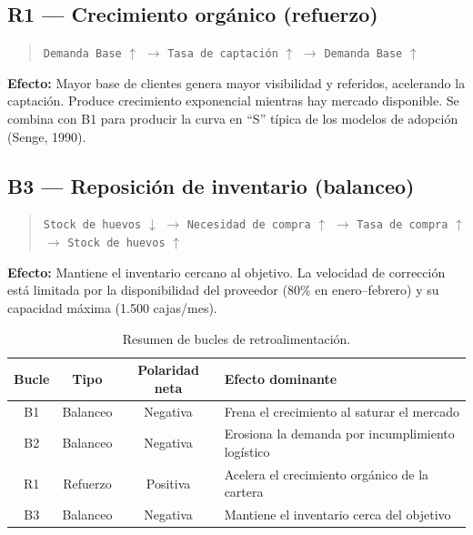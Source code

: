 \documentclass[10pt,a4paper]{article}
\begin{document}
\subsection{R1 --- Crecimiento orgánico \textnormal{(refuerzo)}}

\begin{quote}
\texttt{Demanda Base} $\uparrow$ $\rightarrow$ \texttt{Tasa de captación} $\uparrow$ $\rightarrow$ \texttt{Demanda Base} $\uparrow$
\end{quote}

\textbf{Efecto:} Mayor base de clientes genera mayor visibilidad y referidos, acelerando la captación. Produce crecimiento exponencial mientras hay mercado disponible. Se combina con B1 para producir la curva en ``S'' típica de los modelos de adopción (Senge, 1990).

\subsection{B3 --- Reposición de inventario \textnormal{(balanceo)}}

\begin{quote}
\texttt{Stock de huevos} $\downarrow$ $\rightarrow$ \texttt{Necesidad de compra} $\uparrow$ $\rightarrow$ \texttt{Tasa de compra} $\uparrow$ $\rightarrow$ \texttt{Stock de huevos} $\uparrow$
\end{quote}

\textbf{Efecto:} Mantiene el inventario cercano al objetivo. La velocidad de corrección está limitada por la disponibilidad del proveedor (80\% en enero–febrero) y su capacidad máxima (1.500 cajas/mes).

\begin{table}[H]
\centering
\begin{tabular}{cccp{7cm}}
\toprule
Bucle & Tipo & Polaridad neta & Efecto dominante \\
\midrule
B1 & Balanceo & Negativa & Frena el crecimiento al saturar el mercado \\
B2 & Balanceo & Negativa & Erosiona la demanda por incumplimiento logístico \\
R1 & Refuerzo & Positiva & Acelera el crecimiento orgánico de la cartera \\
B3 & Balanceo & Negativa & Mantiene el inventario cerca del objetivo \\
\bottomrule
\end{tabular}
\caption{Resumen de bucles de retroalimentación.}
\end{table}
\end{document}
